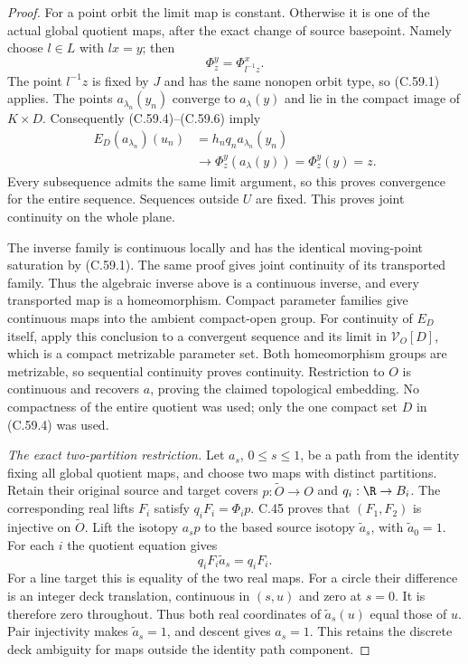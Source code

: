 \begin{proof}
For a point orbit the limit map is constant.
Otherwise it is one of the actual global quotient maps,
after the exact change of source basepoint.
Namely choose $l\in L$ with $lx=y$; then
\[
                 \Phi_z^y=\Phi_{l^{-1}z}^x.             \tag{C.59.6}
\]
The point $l^{-1}z$ is fixed by $J$ and has the same
nonopen orbit type, so (C.59.1) applies.
The points $a_{\lambda_n}(y_n)$ converge to $a_\lambda(y)$
and lie in the compact image of $K\times D$.
Consequently (C.59.4)--(C.59.6) imply
\[
 \begin{split}
 E_D(a_{\lambda_n})(u_n)
     &=h_nq_n a_{\lambda_n}(y_n)\\
     &\longrightarrow\Phi_z^y(a_\lambda(y))
       =\Phi_z^y(y)=z .
 \end{split}                                             \tag{C.59.7}
\]
Every subsequence admits the same limit argument,
so this proves convergence for the entire sequence.
Sequences outside $U$ are fixed.
This proves joint continuity on the whole plane.

The inverse family is continuous locally and has
the identical moving-point saturation by (C.59.1).
The same proof gives joint continuity of its transported
family. Thus the algebraic inverse above is a continuous
inverse, and every transported map is a homeomorphism.
Compact parameter families give continuous maps into
the ambient compact-open group.
For continuity of $E_D$ itself, apply this conclusion
to a convergent sequence and its limit in
$\mathcal V_O[D]$, which is a compact metrizable
parameter set. Both homeomorphism groups are metrizable,
so sequential continuity proves continuity.
Restriction to $O$ is continuous and recovers $a$,
proving the claimed topological embedding.
No compactness of the entire quotient was used;
only the one compact set $D$ in (C.59.4) was used.

\emph{The exact two-partition restriction.}
Let $a_s$, $0\leq s\leq1$, be a path from the identity
fixing all global quotient maps, and choose two maps
with distinct partitions.
Retain their original source and target covers
$p:\widetilde O\to O$ and $q_i:\R\to B_i$.
The corresponding real lifts $F_i$ satisfy
$q_iF_i=\Phi_i p$.
C.45 proves that
$(F_1,F_2)$ is injective on $\widetilde O$.
Lift the isotopy $a_s p$ to the based source isotopy
$\widetilde a_s$, with $\widetilde a_0=1$.
For each $i$ the quotient equation gives
\[
                q_iF_i\widetilde a_s=q_iF_i .          \tag{C.59.8}
\]
For a line target this is equality of the two real
maps. For a circle their difference is an integer
deck translation, continuous in $(s,u)$ and zero
at $s=0$. It is therefore zero throughout.
Thus both real coordinates of $\widetilde a_s(u)$
equal those of $u$. Pair injectivity makes
$\widetilde a_s=1$, and descent gives $a_s=1$.
This retains the discrete deck ambiguity for maps
outside the identity path component.


\end{proof}
